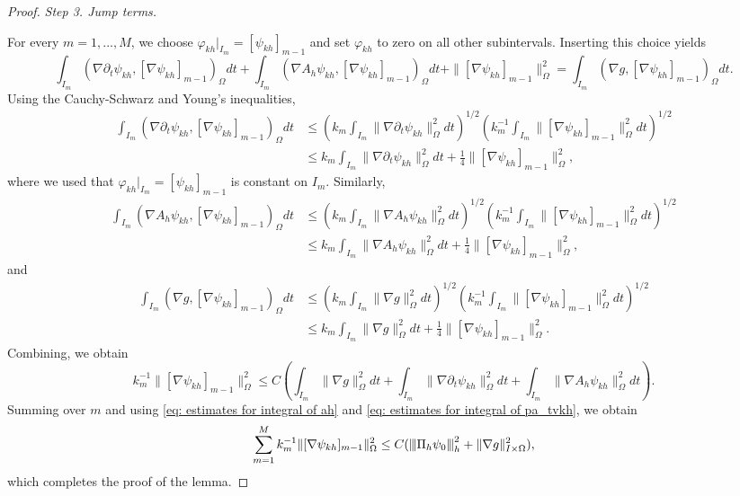 \documentclass{m2an}
\newcommand{\1}{\mathds{1}}
\newcommand{\Om}{\Omega}
\newcommand{\na}{\nabla}
\newcommand{\vertiii}[1]{{\left\vert\kern-0.25ex\left\vert\kern-0.25ex\left\vert #1
    \right\vert\kern-0.25ex\right\vert\kern-0.25ex\right\vert}}
\theoremstyle{definition}
\begin{document}
\begin{proof}
{\it Step 3. Jump terms.}


For every $m=1,...,M$, we choose $\varphi_{kh}|_{I_m} =[\psi_{kh}]_{m-1}$ and set $\varphi_{kh}$
to zero on all other subintervals. Inserting this choice yields
$$
\int_{I_m}(\na\partial_t\psi_{kh},[\na \psi_{kh}]_{m-1})_\Om dt+\int_{I_m}(\na A_h\psi_{kh},[\na \psi_{kh}]_{m-1})_\Om dt +\|[\na \psi_{kh}]_{m-1}\|^2_\Omega =\int_{I_m} (\na g, [\na \psi_{kh}]_{m-1})_\Om dt.
$$
Using the Cauchy-Schwarz and Young's inequalities,
$$
\begin{aligned}
\int_{I_m}(\na\partial_t\psi_{kh},[\na \psi_{kh}]_{m-1})_\Om dt&\le 
\left(k_m\int_{I_m}\|\na\partial_t\psi_{kh}\|^2_\Omega dt\right)^{1/2}\left(k^{-1}_m\int_{I_m}\|[\na \psi_{kh}]_{m-1} \|^2_\Omega dt\right)^{1/2}\\
&\le 
k_m\int_{I_m}\|\na\partial_t\psi_{kh}\|^2_\Omega dt+\frac{1}{4}\|[\na \psi_{kh}]_{m-1} \|^2_\Omega,
\end{aligned}
$$
where we used that $\varphi_{kh}|_{I_m} = [\psi_{kh}]_{m-1}$ is constant on $I_m$. Similarly,
$$
\begin{aligned}
\int_{I_m}(\na A_h\psi_{kh},[\na \psi_{kh}]_{m-1})_\Om dt&\le 
\left(k_m\int_{I_m}\|\na A_h\psi_{kh}\|^2_\Omega dt\right)^{1/2}\left(k^{-1}_m\int_{I_m}\|[\na \psi_{kh}]_{m-1} \|^2_\Omega dt\right)^{1/2}\\
&\le 
k_m\int_{I_m}\|\na A_h\psi_{kh}\|^2_\Omega dt+\frac{1}{4}\|[\na \psi_{kh}]_{m-1} \|^2_\Omega,
\end{aligned}
$$
and
$$
\begin{aligned}
  \int_{I_m} (\na g, [\na \psi_{kh}]_{m-1})_\Om dt&\le \left(k_m\int_{I_m}\|\na g\|^2_\Omega dt\right)^{1/2}\left(k^{-1}_m\int_{I_m}\|[\na \psi_{kh}]_{m-1} \|^2_\Omega dt\right)^{1/2}\\
                                             &\le k_m\int_{I_m}\|\na g\|^2_\Omega dt+\frac{1}{4}\|[\na \psi_{kh}]_{m-1} \|^2_\Omega.
\end{aligned}
$$
Combining, we obtain
$$
k^{-1}_m\|[\na \psi_{kh}]_{m-1}\|^2_\Omega \le C\left(\int_{I_m}\|\na g\|^2_\Omega dt+\int_{I_m}\|\na\partial_t\psi_{kh}\|^2_\Omega dt+\int_{I_m}\|\na A_h\psi_{kh}\|^2_\Omega dt\right).
$$ 
Summing over $m$ and using \eqref{eq: estimates for integral of ah} and \eqref{eq: estimates for integral of pa_tvkh}, we obtain
$$
\sum_{m=1}^Mk^{-1}_m\|[\na \psi_{kh}]_{m-1}\|^2_\Omega 
\le C(\vertiii{\Pi_h \psi_0}^2_h + \|\na g\|^2_{I\times \Om}),
$$
which completes the proof of the lemma. 
\end{proof}
\end{document}
